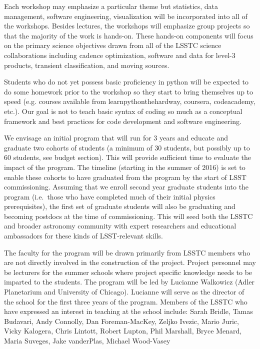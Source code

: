 \documentclass[nofootbib,floatfix,11pt]{article}
\begin{document}
Each workshop may emphasize a particular theme but statistics, data management, software engineering, visualization will be incorporated into all of the workshops. Besides lectures, the workshops will emphasize group projects so that the majority of the work is hands-on. These hands-on components will focus on the primary science objectives drawn from all of the LSSTC science collaborations including cadence optimization, software and data for level-3 products, transient classification, and moving sources.

Students who do not yet possess basic proficiency in python will be expected to do some homework prior to the workshop so they start to bring themselves up to speed (e.g. courses available from learnpythonthehardway, coursera, codeacademy, etc.). Our goal is not to teach basic syntax of coding so much as a conceptual framework and best practices for code development and software engineering. 


We envisage an initial program that will run for 3 years and educate and graduate two cohorts of students (a minimum of 30 students, but possibly up to 60 students, see budget section). This will provide sufficient time to evaluate the impact of the program. The timeline (starting in the summer of  2016) is set to enable these cohorts to have graduated from the program by the start of LSST commissioning. Assuming that we enroll second year graduate students into the program (i.e.\ those who have completed much of their initial physics prerequisites), the first set of graduate students will also be graduating and becoming postdocs at the time of commissioning. This will seed both the LSSTC and broader astronomy community with expert researchers and educational ambassadors for these kinds of LSST-relevant skills.


The faculty for the program will be drawn primarily from LSSTC members who are not directly involved in the construction of the project. Project personnel may be lecturers for the summer schools where project specific knowledge needs to be imparted to the students. The program will be led by Lucianne Walkowicz (Adler Planetarium and University of Chicago). Lucianne will serve as the director of the school for the first three years of the program. Members of the LSSTC who have expressed an interest in teaching at the school include: Sarah Bridle, Tamas Budavari, Andy Connolly, Dan Foreman-MacKey, Zeljko Ivezic, Mario Juric, Vicky Kalogera, Chris Lintott, Robert Lupton, Phil Marshall, Bryce Menard, Maria Suveges, Jake vanderPlas, Michael Wood-Vasey
\end{document}
